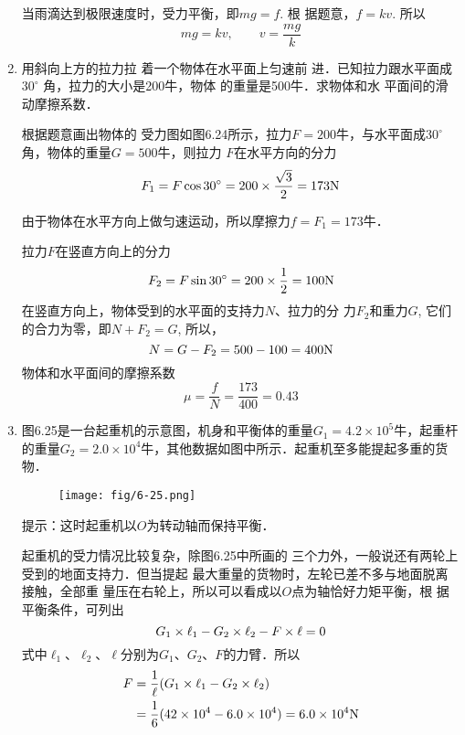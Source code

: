 \begin{enumerate}
\begin{solution}
    当雨滴达到极限速度时，受力平衡，即$mg=f$. 根
    据题意，$f=kv$. 所以
    \[mg =kv,\qquad v=\frac{mg}{k}\]
\end{solution}
\item 用斜向上方的拉力拉
着一个物体在水平面上匀速前
进．已知拉力跟水平面成 $30^{\circ}$
角，拉力的大小是200牛，物体
的重量是500牛．求物体和水
平面间的滑动摩擦系数．

\begin{figure}[htp]
    \centering
{}
    \caption{}
\end{figure}

\begin{solution}
    根据题意画出物体的
    受力图如图6.24所示，拉力$F=200$牛，与水平面成$30^{\circ}$角，物体的重量$G=500$牛，则拉力
    $F$在水平方向的分力
\[    F_1=F\cos 30^{\circ}=200\times\frac{\sqrt{3}}{2}=173{\rm N}\]

由于物体在水平方向上做匀速运动，所以摩擦力$f=F_1=173$牛．

拉力$F$在竖直方向上的分力
\[F_2=F\sin 30^{\circ}=200\times\frac{1}{2}=100{\rm N}\]
在竖直方向上，物体受到的水平面的支持力$N$、拉力的分
力$F_2$和重力$G$, 它们的合力为零，即$N+F_2=G$, 所以，
\[N=G-F_2=500-100=400{\rm N}\]
物体和水平面间的摩擦系数
\[\mu=\frac{f}{N}=\frac{173}{400}=0.43\]
\end{solution}
\item 图6.25是一台起重机的示意图，机身和平衡体的重量$G_1=4.2\times 10^5$牛，起重杆的重量$G_2=2.0\times 10^4$牛，其他数据如图中所示．起重机至多能提起多重的货物．
\begin{figure}[htp]
\centering\texttt{[image: fig/6-25.png]}
\caption{}
\end{figure}
提示：这时起重机以$O$为转动轴而保持平衡．


\begin{solution}
    起重机的受力情况比较复杂，除图6.25中所画的
    三个力外，一般说还有两轮上受到的地面支持力．但当提起
    最大重量的货物时，左轮已差不多与地面脱离接触，全部重
    量压在右轮上，所以可以看成以$O$点为轴恰好力矩平衡，根
    据平衡条件，可列出
\[G_1\times\ell_1-G_2\times\ell_2-F\times\ell=0\]
式中$\ell_1$、$\ell_2$、$\ell$分别为$G_1$、$G_2$、$F$的力臂．所以
\[\begin{split}
    F&=\frac{1}{\ell}(G_1\times\ell_1-G_2\times\ell_2)\\
    &=\frac{1}{6}(42\times 10^4-6.0\times 10^4)=6.0\times 10^4{\rm N}
\end{split}\]
\end{solution}


\end{enumerate}
